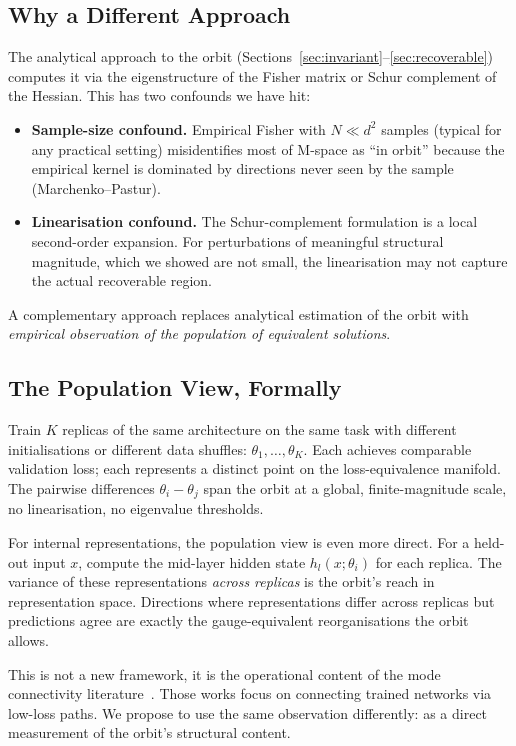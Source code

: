 \documentclass[11pt, a4paper]{article}
\theoremstyle{plain}
\theoremstyle{definition}
\theoremstyle{remark}
\begin{document}
\subsection{Why a Different Approach}

The analytical approach to the orbit (Sections~\ref{sec:invariant}--\ref{sec:recoverable}) computes it via the eigenstructure of the Fisher matrix or Schur complement of the Hessian.
This has two confounds we have hit:
\begin{itemize}[nosep]
\item \textbf{Sample-size confound.} Empirical Fisher with $N \ll d^2$ samples (typical for any practical setting) misidentifies most of M-space as ``in orbit'' because the empirical kernel is dominated by directions never seen by the sample (Marchenko--Pastur).
\item \textbf{Linearisation confound.} The Schur-complement formulation is a local second-order expansion. For perturbations of meaningful structural magnitude, which we showed are not small, the linearisation may not capture the actual recoverable region.
\end{itemize}

A complementary approach replaces analytical estimation of the orbit with \emph{empirical observation of the population of equivalent solutions}.

\subsection{The Population View, Formally}

Train $K$ replicas of the same architecture on the same task with different initialisations or different data shuffles: $\theta_1, \ldots, \theta_K$.
Each achieves comparable validation loss; each represents a distinct point on the loss-equivalence manifold.
The pairwise differences $\theta_i - \theta_j$ span the orbit at a global, finite-magnitude scale, no linearisation, no eigenvalue thresholds.

For internal representations, the population view is even more direct.
For a held-out input $x$, compute the mid-layer hidden state $h_l(x; \theta_i)$ for each replica.
The variance of these representations \emph{across replicas} is the orbit's reach in representation space.
Directions where representations differ across replicas but predictions agree are exactly the gauge-equivalent reorganisations the orbit allows.

This is not a new framework, it is the operational content of the mode connectivity literature~\cite{garipov2018loss, draxler2018essentially, frankle2020linear, ainsworth2023git}.
Those works focus on connecting trained networks via low-loss paths.
We propose to use the same observation differently: as a direct measurement of the orbit's structural content.
\end{document}
